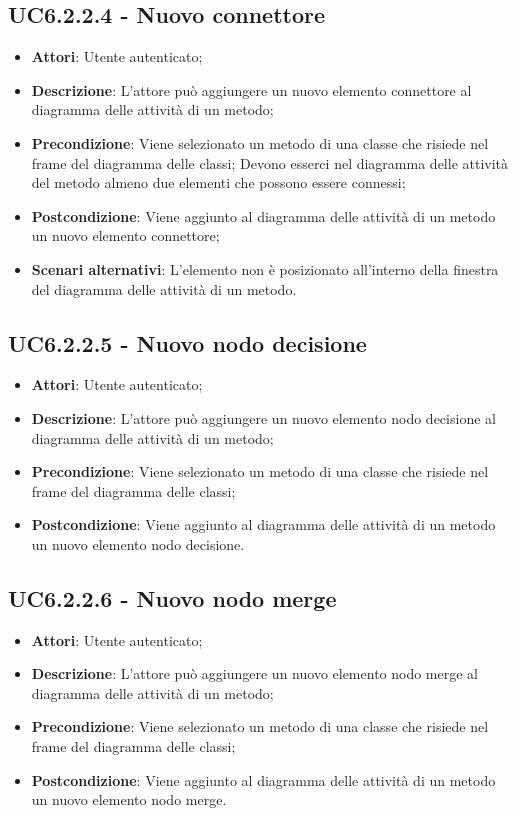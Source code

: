 \subsection{UC6.2.2.4 - Nuovo connettore} 
\label{ssec:UC6.2.2.4} 
\begin{itemize} 
\item \textbf{Attori}: Utente autenticato;
\item \textbf{Descrizione}: L'attore può aggiungere un nuovo elemento connettore al diagramma delle attività di un metodo;
\item \textbf{Precondizione}: Viene selezionato un metodo di una classe che risiede nel frame del diagramma delle  classi; Devono esserci nel diagramma delle attività del metodo almeno due elementi che possono essere connessi;
\item \textbf{Postcondizione}: Viene aggiunto al diagramma delle attività di un metodo un nuovo elemento connettore;
\item \textbf{Scenari alternativi}: L'elemento non è posizionato all'interno della finestra del diagramma delle attività di un metodo.
\end{itemize} 
\subsection{UC6.2.2.5 - Nuovo nodo decisione} 
\label{ssec:UC6.2.2.5} 
\begin{itemize} 
\item \textbf{Attori}: Utente autenticato;
\item \textbf{Descrizione}: L'attore può aggiungere un nuovo elemento nodo decisione al diagramma delle attività di un metodo;
\item \textbf{Precondizione}: Viene selezionato un metodo di una classe che risiede nel frame del diagramma delle  classi;
\item \textbf{Postcondizione}: Viene aggiunto al diagramma delle attività di un metodo un nuovo elemento nodo decisione.
\end{itemize} 
\subsection{UC6.2.2.6 - Nuovo nodo merge} 
\label{ssec:UC6.2.2.6} 
\begin{itemize} 
\item \textbf{Attori}: Utente autenticato;
\item \textbf{Descrizione}: L'attore può aggiungere un nuovo elemento nodo merge al diagramma delle attività di un metodo;
\item \textbf{Precondizione}: Viene selezionato un metodo di una classe che risiede nel frame del diagramma delle  classi;
\item \textbf{Postcondizione}: Viene aggiunto al diagramma delle attività di un metodo un nuovo elemento nodo merge.
\end{itemize} 
